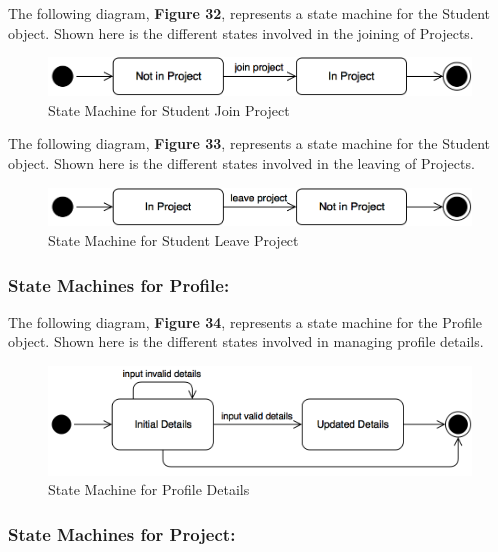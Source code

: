 \documentclass[12pt,letterpaper]{article}
\begin{document}
The following diagram, {\bf Figure 32}, represents a state machine for the Student object. Shown here is the different states involved in the joining of Projects.

\begin{figure}[H]
	\centering{}
	\includegraphics[scale=0.3]{imgs/state/student-join-project.png}
	\caption{State Machine for Student Join Project}
\end{figure}

The following diagram, {\bf Figure 33}, represents a state machine for the Student object. Shown here is the different states involved in the leaving of Projects.

\begin{figure}[H]
	\centering{}
	\includegraphics[scale=0.3]{imgs/state/student-leave-project.png}
	\caption{State Machine for Student Leave Project}
\end{figure}

\subsubsection*{State Machines for Profile:}

The following diagram, {\bf Figure 34}, represents a state machine for the Profile object. Shown here is the different states involved in managing profile details.

\begin{figure}[H]
	\centering{}
	\includegraphics[scale=0.3]{imgs/state/profile-details.png}
	\caption{State Machine for Profile Details}
\end{figure}

\subsubsection*{State Machines for Project:}
\end{document}
